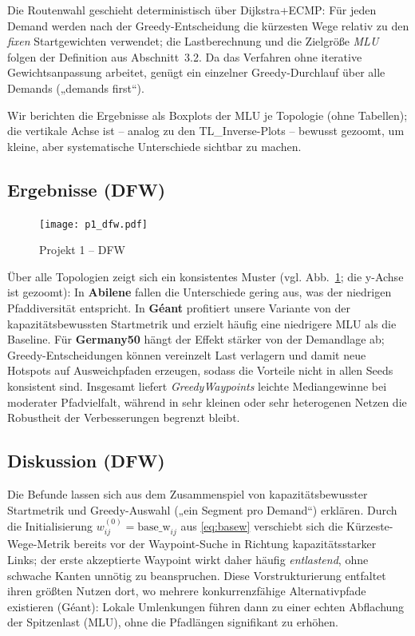 \documentclass[sigconf,nonacm,review]{acmart}
\begin{document}
Die Routenwahl geschieht deterministisch über Dijkstra+ECMP: Für jeden Demand werden nach der
Greedy-Entscheidung die kürzesten Wege relativ zu den \emph{fixen} Startgewichten verwendet; die
Lastberechnung und die Zielgröße \emph{MLU} folgen der Definition aus Abschnitt~3.2. Da das Verfahren
ohne iterative Gewichtsanpassung arbeitet, genügt ein einzelner Greedy-Durchlauf über alle Demands
(„demands first“). 

Wir berichten die Ergebnisse als Boxplots der MLU je Topologie (ohne Tabellen); die vertikale Achse
ist – analog zu den TL\_Inverse-Plots – bewusst gezoomt, um kleine, aber systematische Unterschiede
sichtbar zu machen.

\subsection{Ergebnisse (DFW)}
\begin{figure}[H]
  \centering
  \texttt{[image: p1\_dfw.pdf]}
  \caption{Projekt 1 – DFW}
  \label{fig:p1-dfw}
\end{figure}
\FloatBarrier
\noindent
Über alle Topologien zeigt sich ein konsistentes Muster (vgl. Abb.~\ref{fig:p1-dfw}; die y-Achse ist gezoomt):
In \textbf{Abilene} fallen die Unterschiede gering aus, was der niedrigen Pfaddiversität entspricht.
In \textbf{Géant} profitiert unsere Variante von der kapazitätsbewussten Startmetrik und erzielt
häufig eine niedrigere MLU als die Baseline. Für \textbf{Germany50} hängt der Effekt stärker von der
Demandlage ab; Greedy-Entscheidungen können vereinzelt Last verlagern und damit neue Hotspots auf
Ausweichpfaden erzeugen, sodass die Vorteile nicht in allen Seeds konsistent sind. Insgesamt liefert
\emph{GreedyWaypoints} leichte Mediangewinne bei moderater Pfadvielfalt, während in sehr kleinen oder
sehr heterogenen Netzen die Robustheit der Verbesserungen begrenzt bleibt.

\subsection{Diskussion (DFW)}
Die Befunde lassen sich aus dem Zusammenspiel von kapazitätsbewusster Startmetrik und Greedy-Auswahl
(„ein Segment pro Demand“) erklären. Durch die Initialisierung $w^{(0)}_{ij}=\mathrm{base\_w}_{ij}$ aus
\eqref{eq:basew} verschiebt sich die Kürzeste-Wege-Metrik bereits vor der Waypoint-Suche in Richtung
kapazitätsstarker Links; der erste akzeptierte Waypoint wirkt daher häufig \emph{entlastend}, ohne schwache
Kanten unnötig zu beanspruchen. Diese Vorstrukturierung entfaltet ihren größten Nutzen dort, wo mehrere
konkurrenzfähige Alternativpfade existieren (Géant): Lokale Umlenkungen führen dann zu einer echten
Abflachung der Spitzenlast (MLU), ohne die Pfadlängen signifikant zu erhöhen.
\end{document}
